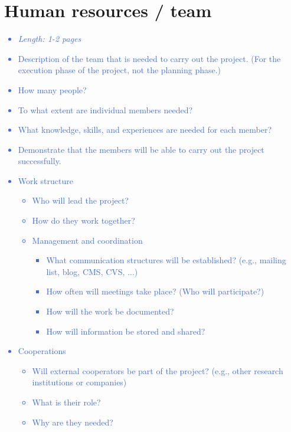 \documentclass[a4paper,11pt]{article}
\providecommand*{\note}[1]{\small \textcolor{RoyalBlue}{\begin{minipage}{\textwidth}{#1}\end{minipage}}}
\begin{document}
\pagebreak


\section{Human resources / team}
\label{sect:team}

\note{
\begin{itemize}
\item {\em Length: 1-2 pages}
\item Description of the team that is needed to carry out the project. (For the execution phase of the project, not the planning phase.)
\item How many people?
\item To what extent are individual members needed?
\item What knowledge, skills, and experiences are needed for each member?
\item Demonstrate that the members will be able to carry out the project successfully.
\item Work structure
	\begin{itemize}
	\item     Who will lead the project?
	\item     How do they work together?
	\item     Management and coordination
		\begin{itemize}
		\item 	        What communication structures will be established? (e.g., mailing list, blog, CMS, CVS, ...)
		\item 	        How often will meetings take place? (Who will participate?)
		\item 	        How will the work be documented?
		\item 	        How will information be stored and shared?
		\end{itemize}
	\end{itemize}
\item Cooperations
	\begin{itemize}
	\item     Will external cooperators be part of the project? (e.g., other research institutions or companies)
	\item     What is their role?
	 \item    Why are they needed?
	\end{itemize}
\end{itemize}
}
\end{document}
